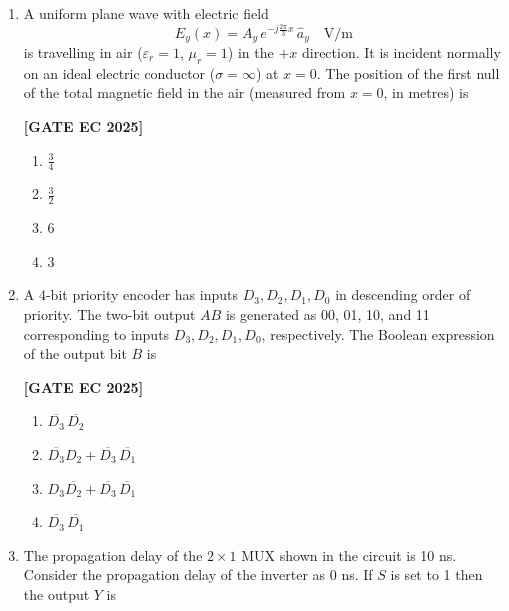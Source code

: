\documentclass[12pt]{article}
\begin{document}
\begin{enumerate}[leftmargin=1.5em, label=\textbf{Q.\arabic*}., itemsep=2em]
\item A uniform plane wave with electric field
\[
E_y(x) = A_y \, e^{-j\frac{2\pi}{3}x} \,\hat{a}_y \quad \text{V/m}
\]
is travelling in air ($\varepsilon_r = 1$, $\mu_r=1$) in the $+x$ direction. It is incident normally on an ideal electric conductor ($\sigma = \infty$) at $x=0$. The position of the first null of the total magnetic field in the air (measured from $x=0$, in metres) is

\noindent \textbf{[GATE EC 2025]}
\begin{multicols}{2}
\begin{enumerate}
    \item $\tfrac{3}{4}$
    \item $\tfrac{3}{2}$
    \item $6$
    \item $3$
\end{enumerate}
\end{multicols}

\item A 4-bit priority encoder has inputs $D_3, D_2, D_1, D_0$ in descending order of priority. The two-bit output $AB$ is generated as 00, 01, 10, and 11 corresponding to inputs $D_3, D_2, D_1, D_0$, respectively. The Boolean expression of the output bit $B$ is

\noindent \textbf{[GATE EC 2025]}
\begin{multicols}{2}
\begin{enumerate}
    \item $\overline{D_3}\,\overline{D_2}$
    \item $\overline{D_3}D_2 + \overline{D_3}\,\overline{D_1}$
    \item $D_3 \overline{D_2} + \overline{D_3}\,\overline{D_1}$
    \item $\overline{D_3}\,\overline{D_1}$
\end{enumerate}
\end{multicols}

\item The propagation delay of the $2\times1$ MUX shown in the circuit is 10 ns. Consider the propagation delay of the inverter as 0 ns. If $S$ is set to 1 then the output $Y$ is


\end{enumerate}
\end{document}
